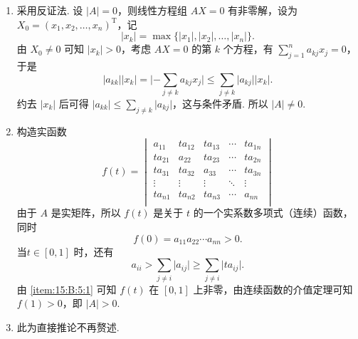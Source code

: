 \documentclass[UTF8,12pt,a4paper,fontset=fandol]{ctexart}
\begin{document}
\begin{solve}
\begin{enumerate}
                \item \label{item:15:B:5:1}
                      采用反证法. 设 $\lvert A \rvert = 0$，则线性方程组 $AX = 0$ 有非零解，设为 $X_0 = (x_1, x_2, \ldots, x_n)^{\mathrm{T}}$，记
                      \[\lvert x_k \rvert = \max \{\lvert x_1 \rvert, \lvert x_2 \rvert, \ldots, \lvert x_n \rvert\}.\]
                      由 $X_0 \neq 0$ 可知 $\lvert x_k \rvert > 0$，考虑 $AX = 0$ 的第 $k$ 个方程，有 $\displaystyle\sum_{j=1}^n a_{kj}x_j = 0$，于是
                      \[\lvert a_{kk} \rvert \lvert x_k \rvert = \lvert -\displaystyle\sum_{j \neq k}a_{kj}x_j \rvert \leqslant \sum_{j \neq k}\lvert a_{kj} \rvert \lvert x_k \rvert.\]
                      约去 $\lvert x_k \rvert$ 后可得 $\lvert a_{kk} \rvert \leqslant \displaystyle\sum_{j \neq k} \lvert a_{kj} \rvert$，这与条件矛盾. 所以 $\lvert A \rvert \neq 0$.

                \item 构造实函数
                      \[f(t) = \begin{vmatrix}
                              a_{11}  & ta_{12} & ta_{13} & \cdots & ta_{1n} \\
                              ta_{21} & a_{22}  & ta_{23} & \cdots & ta_{2n} \\
                              ta_{31} & ta_{32} & a_{33}  & \cdots & ta_{3n} \\
                              \vdots  & \vdots  & \vdots  & \ddots & \vdots  \\
                              ta_{n1} & ta_{n2} & ta_{n3} & \cdots & a_{nn}  \\
                          \end{vmatrix}\]
                      由于 $A$ 是实矩阵，所以 $f(t)$ 是关于 $t$ 的一个实系数多项式（连续）函数，同时
                      \[f(0) = a_{11}a_{22}\cdots a_{nn} > 0.\]
                      当$t \in [0, 1]$ 时，还有
                      \[a_{ii} > \sum_{j \neq i} \lvert a_{ij} \rvert \geqslant \sum_{j \neq i} \lvert ta_{ij} \rvert.\]
                      由 \eqref{item:15:B:5:1} 可知 $f(t)$ 在 $[0, 1]$ 上非零，由连续函数的介值定理可知 $f(1) > 0$，即 $\lvert A \rvert > 0$.

                \item 此为直接推论不再赘述.
            \end{enumerate}
\end{solve}
\end{document}
